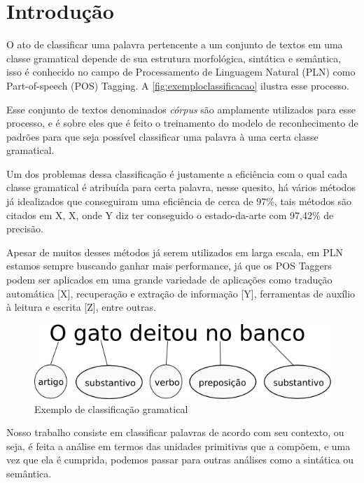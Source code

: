 \chapter{Introdução}\label{introducao}

O ato de classificar uma palavra pertencente a um conjunto de textos em uma classe gramatical depende de sua estrutura morfológica, sintática e semântica, isso é conhecido no campo de Processamento de Linguagem Natural (PLN) como Part-of-speech (POS) Tagging. A \autoref{fig:exemploclassificacao} ilustra esse processo. 

Esse conjunto de textos denominados \textit{córpus} são amplamente utilizados para esse processo, e é sobre eles que é feito o treinamento do modelo de reconhecimento de padrões para que seja possível classificar uma palavra à uma certa classe gramatical.

Um dos problemas dessa classificação é justamente a eficiência com o qual cada classe gramatical é atribuída para certa palavra, nesse quesito, há vários métodos já idealizados que conseguiram uma eficiência de cerca de 97\%, tais métodos são citados em X, X, onde Y diz ter conseguido o estado-da-arte com 97,42\% de precisão.

Apesar de muitos desses métodos já serem utilizados em larga escala, em PLN estamos sempre buscando ganhar mais performance, já que os POS Taggers podem ser aplicados em uma grande variedade de aplicações como tradução automática [X], recuperação e extração de informação [Y], ferramentas de auxílio à leitura e escrita [Z], entre outras.

\begin{figure}[htb]
  \caption{Exemplo de classificação gramatical}\label{fig:exemploclassificacao}
  \begin{center}
      \includegraphics[scale=0.5]{img/exemplo_classificacao}
  \end{center}
\end{figure}

Nosso trabalho consiste em classificar palavras de acordo com seu contexto, ou seja, é feita a análise em termos das unidades primitivas que a compõem, e uma vez que ela é cumprida, podemos passar para outras análises como a sintática ou semântica.


